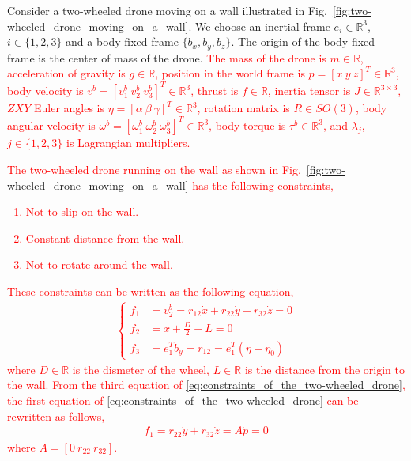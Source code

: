 Consider a two-wheeled drone moving on a wall illustrated in Fig.~\ref{fig:two-wheeled_drone_moving_on_a_wall}.
We choose an inertial frame $e_i \in \mathbb{R}^3$, $i \in \{1, 2, 3 \}$ and a body-fixed frame $\{b_x, b_y, b_z\}$.
The origin of the body-fixed frame is the center of mass of the drone.
\textcolor{red}{
The mass of the drone is $m \in \mathbb{R}$, acceleration of gravity is $g \in \mathbb{R}$, position in the world frame is $p = [x ~ y ~ z]^T \in \mathbb{R}^3$, body velocity is $v^b = [v_1^b ~ v_2^b ~ v_3^b]^T \in \mathbb{R}^ 3$, thrust is $f \in \mathbb{R}$, inertia tensor is $J \in \mathbb{R}^{3 \times 3}$, $ZXY$ Euler angles is $\eta = [\alpha ~ \beta ~ \gamma]^T \in \mathbb{R}^3$, rotation matrix is $R \in SO(3)$, body angular velocity is $\omega^b = [\omega_1^b ~ \omega_2^b ~ \omega_3^b]^T \in \mathbb{R}^3$, body torque is $\tau^b \in \mathbb{R}^3$, and $ \lambda_j $, $ j \in \{1,2,3\} $ is Lagrangian multipliers.
}
\textcolor{red}{
The two-wheeled drone running on the wall as shown in Fig.~\ref{fig:two-wheeled_drone_moving_on_a_wall} has the following constraints,
\begin{enumerate}
    \item Not to slip on the wall.
    \item Constant distance from the wall.
    \item Not to rotate around the wall.
\end{enumerate}
These constraints can be written as the following equation,
\begin{align}
    \begin{cases}
        \label{eq:constraints_of_the_two-wheeled_drone}
        f_1 &= v_2^b = r_{12} \dot{x} + r_{22} \dot{y} + r_{32} \dot{z} = 0\\
        f_2 &= x + \frac{D}{2} - L = 0\\
        f_3 &= e_1^T b_y = r_{12} = e_1^T (\eta - \eta_0)
    \end{cases}
\end{align}
where $ D \in \mathbb{R} $ is the dismeter of the wheel, $ L \in \mathbb{R} $ is the distance from the origin to the wall.
From the third equation of \eqref{eq:constraints_of_the_two-wheeled_drone}, the first equation of \eqref{eq:constraints_of_the_two-wheeled_drone} can be rewritten as follows,
\begin{align}
    \label{eq:first_constraint_rewritten}
    f_1 = r_{22} \dot{y} + r_{32} \dot{z} = A \dot{p} = 0
\end{align}
where $ A = [0 ~ r_{22} ~ r_{32}] $.
}

